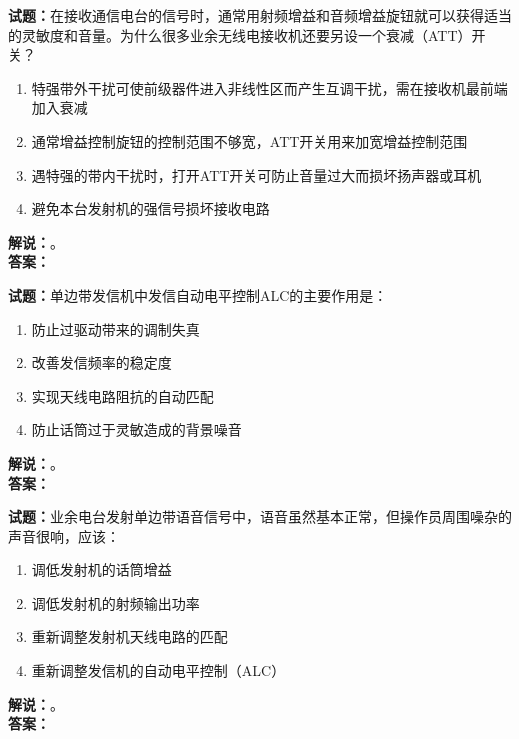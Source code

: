 \documentclass{ctexbook}
\begin{document}
\vspace{\baselineskip}

\noindent\textbf{试题：}在接收通信电台的信号时，通常用射频增益和音频增益旋钮就可以获得适当的灵敏度和音量。为什么很多业余无线电接收机还要另设一个衰减（ATT）开关？
\begin{enumerate}[leftmargin=3em]
  \item 特强带外干扰可使前级器件进入非线性区而产生互调干扰，需在接收机最前端加入衰减
  \item 通常增益控制旋钮的控制范围不够宽，ATT开关用来加宽增益控制范围
  \item 遇特强的带内干扰时，打开ATT开关可防止音量过大而损坏扬声器或耳机
  \item 避免本台发射机的强信号损坏接收电路
\end{enumerate}
\noindent\textbf{解说：}\textbf{}。\\\noindent\textbf{答案：}

\vspace{\baselineskip}

\noindent\textbf{试题：}单边带发信机中发信自动电平控制ALC的主要作用是：
\begin{enumerate}[leftmargin=3em]
  \item 防止过驱动带来的调制失真
  \item 改善发信频率的稳定度
  \item 实现天线电路阻抗的自动匹配
  \item 防止话筒过于灵敏造成的背景噪音
\end{enumerate}
\noindent\textbf{解说：}\textbf{}。\\\noindent\textbf{答案：}

\vspace{\baselineskip}

\noindent\textbf{试题：}业余电台发射单边带语音信号中，语音虽然基本正常，但操作员周围噪杂的声音很响，应该：
\begin{enumerate}[leftmargin=3em]
  \item 调低发射机的话筒增益
  \item 调低发射机的射频输出功率
  \item 重新调整发射机天线电路的匹配
  \item 重新调整发信机的自动电平控制（ALC）
\end{enumerate}
\noindent\textbf{解说：}\textbf{}。\\\noindent\textbf{答案：}

\vspace{\baselineskip}
\end{document}
